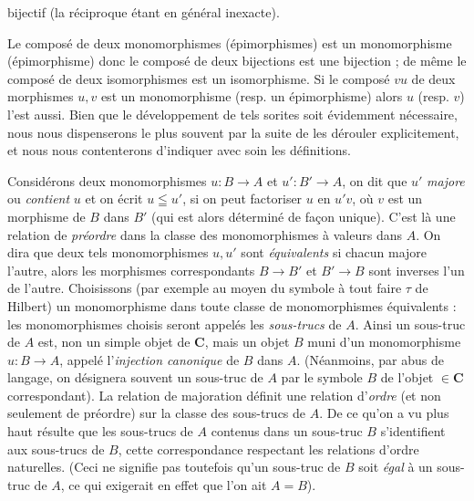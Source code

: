 
\noindent bijectif (la réciproque étant en général inexacte).

Le composé de deux monomorphismes (épimorphismes) est un monomorphisme
(épimorphisme) donc le composé de deux bijections est une bijection ; de même
le composé de deux isomorphismes est un isomorphisme. Si le composé $vu$ de
deux morphismes $u,v$ est un monomorphisme (resp. un épimorphisme) alors $u$
(resp. $v$) l'est aussi. Bien que le développement de tels sorites soit
évidemment nécessaire, nous nous dispenserons le plus souvent par la suite de
les dérouler explicitement, et nous nous contenterons d'indiquer avec soin les
définitions.

Considérons deux monomorphismes $u:B\to A$ et
$u':B'\to A$, on dit que $u'$ \textit{majore} ou \textit{contient} $u$ et
on écrit $u\leqq u'$, si on peut factoriser $u$ en $u'v$, où $v$ est un
morphisme de $B$ dans $B'$ (qui est alors déterminé de façon unique). C'est là
une relation de \textit{préordre} dans la classe des monomorphismes à valeurs
dans $A$. On dira que deux tels monomorphismes $u,u'$ sont
\textit{équivalents} si chacun majore l'autre, alors les morphismes
correspondants $B\to B'$ et $B'\to B$ sont inverses
l'un de l'autre. Choisissons (par exemple au moyen du symbole à tout faire
$\tau$ de Hilbert) un monomorphisme dans toute classe de monomorphismes
équivalents : les monomorphismes choisis seront appelés les
\textit{sous-trucs} de $A$. Ainsi un sous-truc de $A$ est, non un simple objet
de $\mathbf{C}$, mais un objet $B$ muni d'un monomorphisme $u:B\to A$,
appelé l'\textit{injection canonique} de $B$ dans $A$. (Néanmoins, par abus de
langage, on désignera souvent un sous-truc de $A$ par le symbole $B$ de
l'objet $\in\mathbf{C}$ correspondant). La relation de majoration définit une relation
d'\textit{ordre} (et non seulement de préordre) sur la classe des sous-trucs de
$A$. De ce qu'on a vu plus haut résulte que les sous-trucs de $A$ contenus dans
un sous-truc $B$ s'identifient aux sous-trucs de $B$, cette correspondance
respectant les relations d'ordre naturelles. (Ceci ne signifie pas toutefois
qu'un sous-truc de $B$ soit \textit{égal} à un sous-truc de $A$, ce qui
exigerait en effet que l'on ait $A=B$).

